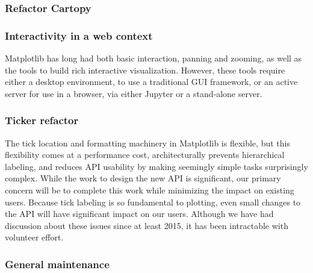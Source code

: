 \documentclass[12pt]{article}
\numberwithin{page}{section}
\begin{document}
\subsubsection{Refactor Cartopy}

\subsubsection{Interactivity in a web context}

Matplotlib has long had both basic interaction, panning and zooming, as well as
the tools to build rich interactive visualization.  However, these tools
require either a desktop environment, to use a traditional GUI framework, or an
active server for use in a browser, via either Jupyter or a stand-alone server.


\subsubsection{Ticker refactor}

The tick location and formatting machinery in Matplotlib is flexible, but this
flexibility comes at a performance cost, architecturally prevents hierarchical
labeling, and reduces API usability by making seemingly simple tasks
surprisingly complex.  While the work to design the new API is significant, our
primary concern will be to complete this work while minimizing the impact on
existing users.  Because tick labeling is so fundamental to plotting, even
small changes to the API will have significant impact on our users.  Although
we have had discussion about these issues since at least 2015, it has
been intractable with volunteer effort.


\subsubsection{General maintenance}
\end{document}
